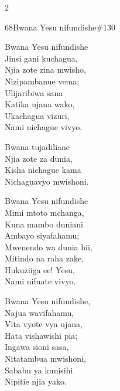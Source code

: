 \documentclass{article}
\begin{document}
\begin{multicols}{2}
\begin{hymn}{68}{Bwana Yesu nifundishe}{\#130}
\begin{stanza}
Bwana Yesu nifundishe\\
Jinsi gani kuchagua,\\
Njia zote zina mwisho,\\
Nizipambanue vema;\\
Ulijaribiwa sana\\
Katika ujana wako,\\
Ukachagua vizuri,\\
Nami nichague vivyo.
\end{stanza}
\begin{chorus}
Bwana tujadiliane\\
Njia zote za dunia,\\
Kisha nichague kama\\
Nichaguavyo mwishoni.
\end{chorus}
\begin{stanza}
Bwana Yesu nifundishe\\
Mimi mtoto mchanga,\\
Kuna mambo duniani\\
Ambayo siyafahamu;\\
Mwenendo wa dunia hii,\\
Mitindo na raha zake,\\
Hukuziiga ee! Yesu,\\
Nami nifuate vivyo.
\end{stanza}
\begin{stanza}
Bwana Yesu nifundishe,\\
Najua wavifahamu,\\
Vita vyote vya ujana,\\
Hata vishawishi pia;\\
Ingawa sioni sasa,\\
Nitatambua mwishoni,\\
Sababu ya kunisihi\\
Nipitie njia yako.
\end{stanza}
\end{hymn}


\end{multicols}
\end{document}
